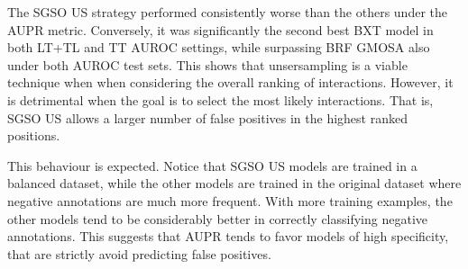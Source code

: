 The SGSO US strategy performed consistently worse than the others under the AUPR metric. Conversely, it was significantly the second best BXT model in both LT+TL and TT AUROC settings, while surpassing BRF GMOSA also under both AUROC test sets.
This shows that unsersampling is a viable technique when when considering the overall ranking of interactions. However, it is detrimental when the goal is to select the most likely interactions. That is, SGSO US allows a larger number of false positives in the highest ranked positions.

This behaviour is expected. Notice that SGSO US models are trained in a balanced dataset, while the other models are trained in the original dataset where negative annotations are much more frequent. With more training examples, the other models tend to be considerably better in correctly classifying negative annotations. This suggests that AUPR tends to favor models of high specificity, that are strictly avoid predicting false positives.






